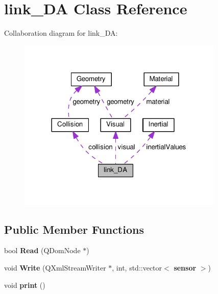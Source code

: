 \section{link\+\_\+\+DA Class Reference}
\label{classlink___d_a}


Collaboration diagram for link\+\_\+\+DA\+:\nopagebreak
\begin{figure}[H]
\begin{center}
\leavevmode
\includegraphics[width=278pt]{classlink___d_a__coll__graph}
\end{center}
\end{figure}
\subsection*{Public Member Functions}
\begin{DoxyCompactItemize}
\item 
bool {\bfseries Read} (Q\+Dom\+Node $\ast$)\label{classlink___d_a_af9b428a018e41a5f99f867f977153e26}

\item 
void {\bfseries Write} (Q\+Xml\+Stream\+Writer $\ast$, int, std\+::vector$<$ {\bf sensor} $>$)\label{classlink___d_a_abf4814d7027bfe0d12595e6cc00be4b7}

\item 
void {\bfseries print} ()\label{classlink___d_a_ae1673b4833980f0be41ffa9c3b14609c}

\end{DoxyCompactItemize}
